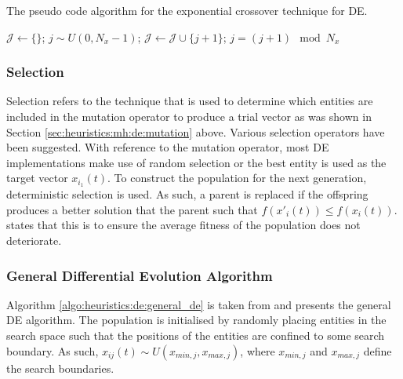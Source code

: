 \begin{algorithm}[H]
      \caption{The pseudo code algorithm for the exponential crossover technique for \ac{DE}.}
      \label{algo:heuristics:de:exp}
      \begin{algorithmic}
            \State $\mathcal{J} \gets \{\}$;
            \State $j \sim U(0,N_{x} - 1)$;
            \Repeat
            \State $\mathcal{J} \gets \mathcal{J} \cup \{j + 1 \}$;
            \State $j = (j+1) \mod N_{x}$
      \end{algorithmic}
\end{algorithm}

\subsubsection{Selection}
\label{sec:heuristics:mh:de:selection}

Selection refers to the technique that is used to determine which entities are included in the mutation operator to produce a trial vector \cite{ref:engelbrecht:2007} as was shown in Section \ref{sec:heuristics:mh:de:mutation} above. Various selection operators have been suggested. With reference to the mutation operator, most \ac{DE} implementations make use of random selection or the best entity is used as the target vector $x_{i_{1}}(t)$. To construct the population for the next generation, deterministic selection is used. As such, a parent is replaced if the offspring produces a better solution that the parent such that $f(x'_{i}(t)) \leq f(x_{i}(t))$. \citeauthor{ref:engelbrecht:2007}\cite{ref:engelbrecht:2007} states that this is to ensure the average fitness of the population does not deteriorate.


\subsubsection{General Differential Evolution Algorithm}

Algorithm \ref{algo:heuristics:de:general_de} is taken from \cite{ref:engelbrecht:2007} and presents the general \ac{DE} algorithm. The population is initialised by randomly placing entities in the search space such that the positions of the entities are confined to some search boundary. As such, $x_{ij}(t) \sim U(x_{min,j}, x_{max,j})$, where $x_{min,j}$ and $x_{max,j}$ define the search boundaries.

